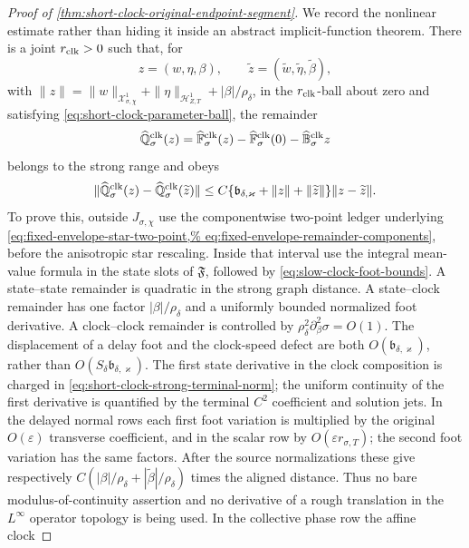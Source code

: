 \begin{proof}[Proof of
\cref{thm:short-clock-original-endpoint-segment}]
We record the nonlinear estimate rather than hiding it inside an abstract
implicit-function theorem.  There is a joint \(r_{\rm clk}>0\) such that,
for
\[
 z=(w,\eta,\beta),\qquad
 \widetilde z=(\widetilde w,\widetilde\eta,\widetilde\beta),
\]
with
\(
 \|z\|=\|w\|_{\mathcal X_{\sigma,\chi}^1}
          +\|\eta\|_{\mathcal H_{Z,T}^1}
          +|\beta|/\rho_\delta
\),
in the \(r_{\rm clk}\)-ball about zero and satisfying
\cref{eq:short-clock-parameter-ball}, the remainder
\[
 \widehat{\mathbb Q}_\sigma^{\rm clk}(z)
 =\widehat{\mathbb F}_\sigma^{\rm clk}(z)
 -\widehat{\mathbb F}_\sigma^{\rm clk}(0)
 -\widehat{\mathbb B}_\sigma^{\rm clk}z
\]
belongs to the strong range and obeys
\begin{equation}
 \|\widehat{\mathbb Q}_\sigma^{\rm clk}(z)
       -\widehat{\mathbb Q}_\sigma^{\rm clk}(\widetilde z)\|
 \le C\{\mathfrak b_{\delta,\varkappa}
          +\|z\|+\|\widetilde z\|\}
       \|z-\widetilde z\|.                      \label{eq:proof-clock-two-point}
\end{equation}
To prove this, outside \(J_{\sigma,\chi}\) use the componentwise two-point
ledger underlying
\cref{eq:fixed-envelope-star-two-point,%
eq:fixed-envelope-remainder-components}, before the anisotropic star
rescaling.  Inside that interval use the
integral mean-value formula in the state slots of \(\mathfrak F\), followed
by \cref{eq:slow-clock-foot-bounds}.  A state--state remainder is
quadratic in the strong graph distance.  A state--clock remainder has one
factor \(|\beta|/\rho_\delta\) and a uniformly bounded normalized foot
derivative.  A clock--clock remainder is controlled by
\(\rho_\delta^2\partial_\beta^2\sigma=O(1)\).  The displacement of a
delay foot and the clock-speed defect are both
\(O(\mathfrak b_{\delta,\varkappa})\), rather than
\(O(S_\delta\mathfrak b_{\delta,\varkappa})\).  The first state derivative
in the clock composition is charged in
\cref{eq:short-clock-strong-terminal-norm}; the uniform continuity of the
first derivative is quantified by the terminal \(C^2\) coefficient and
solution jets.  In the delayed normal rows each first foot variation is
multiplied by the original \(O(\varepsilon)\) transverse coefficient, and
in the scalar row by \(O(\varepsilon r_{\sigma,T})\); the second foot
variation has the same factors.  After the source normalizations these
give respectively
\(C(|\beta|/\rho_\delta+|\widetilde\beta|/\rho_\delta)\)
times the aligned distance.  Thus no bare modulus-of-continuity assertion
and no derivative of a rough translation in the \(L^\infty\) operator
topology is being used.  In the collective phase row the affine clock

\end{proof}
